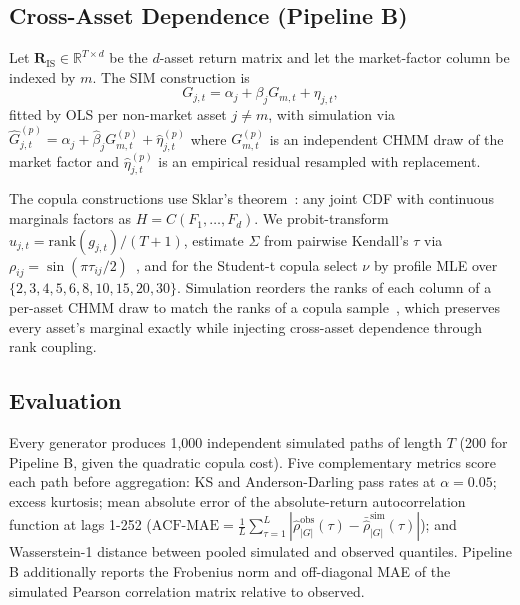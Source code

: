 \documentclass[sigconf,anonymous,nonacm=true]{acmart}
\begin{document}
\subsection{Cross-Asset Dependence (Pipeline B)}
\label{sec:methods_ca}

Let $\mathbf{R}_{\text{IS}} \in \mathbb{R}^{T \times d}$ be the $d$-asset
return matrix and let the market-factor column be indexed by $m$. The
SIM construction is
\begin{equation}
  G_{j,t} = \alpha_j + \beta_j G_{m,t} + \eta_{j,t},
  \label{eq:sim}
\end{equation}
fitted by OLS per non-market asset $j \neq m$, with simulation via
$\hat{G}_{j,t}^{(p)} = \hat\alpha_j + \hat\beta_j G_{m,t}^{(p)} +
\hat\eta_{j,t}^{(p)}$ where $G_{m,t}^{(p)}$ is an independent CHMM draw of
the market factor and $\hat\eta_{j,t}^{(p)}$ is an empirical residual
resampled with replacement.

The copula constructions use Sklar's theorem~\cite{sklar1959fonctions}:
any joint CDF with continuous marginals factors as $H = C(F_1, \ldots,
F_d)$. We probit-transform $u_{j,t} = \text{rank}(g_{j,t}) / (T + 1)$,
estimate $\Sigma$ from pairwise Kendall's $\tau$ via $\rho_{ij} =
\sin(\pi \tau_{ij} / 2)$~\cite{embrechts2002correlation}, and for the
Student-t copula select $\nu$ by profile MLE over $\{2, 3, 4, 5, 6, 8,
10, 15, 20, 30\}$. Simulation reorders the ranks of each column of a
per-asset CHMM draw to match the ranks of a copula
sample~\cite{iman1982distribution}, which preserves every asset's
marginal exactly while injecting cross-asset dependence through rank
coupling.

\subsection{Evaluation}
\label{sec:methods_eval}

Every generator produces 1{,}000 independent simulated paths of length
$T$ (200 for Pipeline B, given the quadratic copula cost). Five
complementary metrics score each path before aggregation: KS and
Anderson-Darling pass rates at $\alpha = 0.05$; excess kurtosis;
mean absolute error of the absolute-return autocorrelation function at
lags 1-252 ($\text{ACF-MAE} = \frac{1}{L} \sum_{\tau = 1}^{L} |
\hat\rho^{\text{obs}}_{|G|}(\tau) - \bar{\hat\rho}^{\text{sim}}_{|G|}(\tau) |$);
and Wasserstein-1 distance between pooled simulated and observed
quantiles. Pipeline B additionally reports the Frobenius norm and
off-diagonal MAE of the simulated Pearson correlation matrix relative
to observed.
\end{document}
